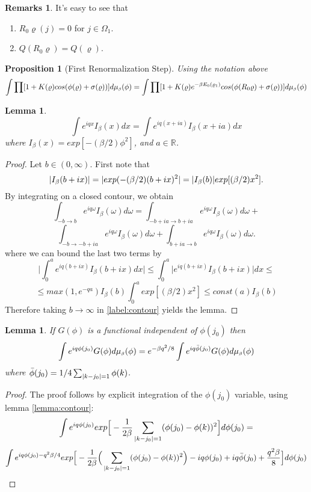 \documentclass[11pt,reqno]{article}
\DeclarePairedDelimiter\abs{\lvert}{\rvert}%
\newtheorem{lemma}[thm]{Lemma}
\newtheorem{prop}[thm]{Proposition}
\theoremstyle{definition}
\newtheorem*{remarks}{Remarks}
\begin{document}
\begin{remarks}
It's easy to see that
\begin{enumerate}
\item $R_0\varrho(j) = 0$ for $j\in\Omega_1$.
\item $Q(R_0\varrho) = Q(\varrho)$.
\end{enumerate}
\end{remarks}


\begin{prop}[First Renormalization Step] \label{prop:lem418}
Using the notation above
$$
\int \prod [1+K(\varrho)cos(\phi(\varrho) + \sigma(\varrho))] d\mu_{\text{\tiny$\beta$}}(\phi) = 
\int \prod [1+K(\varrho)e^{-\beta E_0(\varrho_1)}cos(\phi(R_0\varrho) + \sigma(\varrho))] d\mu_{\text{\tiny$\beta$}}(\phi)
$$
\end{prop}


\begin{lemma} \label{lemma:contour}
\begin{equation}
\int e^{i q x} I_\beta(x)dx = \int e^{i q (x+ia)} I_\beta(x+ia)dx
\end{equation}
where $I_\beta(x) = exp[-(\beta/2)\phi^2]$, and $a\in \mathbb{R}$.
\end{lemma}
\begin{proof}
Let $b \in (0,\infty)$. First note that 
$$
\abs{I_\beta(b+ix)} = \abs{exp(-(\beta/2) (b+ix)^2} = \abs{I_\beta(b)}exp[(\beta/2)x^2].
$$
By integrating on a closed contour, we obtain
$$
\int_{-b \rightarrow b} e^{i q \omega} I_\beta(\omega)d\omega =
\int_{-b+ia \rightarrow b+ia} e^{i q \omega} I_\beta(\omega)d\omega + 
$$
\begin{equation} \label{label:contour}
\int_{-b \rightarrow -b+ia} e^{i q \omega} I_\beta(\omega)d\omega +
\int_{b+ia \rightarrow b} e^{i q \omega} I_\beta(\omega)d\omega.
\end{equation}
where we can bound the last two terms by
$$
\Bigg| \int_0^a e^{iq(b+ix)}I_\beta(b+ix)dx \Bigg| \leq 
\int_0^a \Big| e^{iq(b+ix)}I_\beta(b+ix)\Big| dx \leq
$$
$$
\leq max(1, e^{-qa}) I_\beta(b) \int_0^a exp[(\beta/2)x^2] \leq const(a)I_\beta(b)
$$
Therefore taking $b\rightarrow\infty$ in \eqref{label:contour} yields the lemma.
\end{proof}

\begin{lemma} \label{lemma:lem42}
If $G(\phi)$ is a functional independent of $\phi(j_0)$ then
\begin{equation}
\int e^{i q \phi(j_0)} G(\phi)d\mu_{\text{\tiny$\beta$}}(\phi) = e^{-\beta q^2/8} \int e^{i q \bar{\phi}(j_0)} G(\phi)d\mu_{\text{\tiny$\beta$}}(\phi)
\end{equation}
where $\bar{\phi}(j_0)=1/4\sum_{\abs{k-j_0}=1} \phi(k)$.
\end{lemma}
\begin{proof}
The proof follows by explicit integration of the $\phi(j_0)$ variable, using lemma \eqref{lemma:contour}:
$$
\int e^{i q \phi(j_0)} exp \Big[ -\frac{1}{2\beta} \sum_{\abs{k-j_0}=1}(\phi(j_0)-\phi(k))^2 \Big] d\phi(j_0) =
$$
$$
\int e^{i q \phi(j_0) - q^2\beta/4} exp \Big[ -\frac{1}{2\beta} \Big( \sum_{\abs{k-j_0}=1}(\phi(j_0)-\phi(k))^2 \Big) - i q \phi(j_0) + iq\bar{\phi}(j_0) + \frac{q^2\beta}{8}\Big] d\phi(j_0)
$$
\end{proof}
\end{document}
